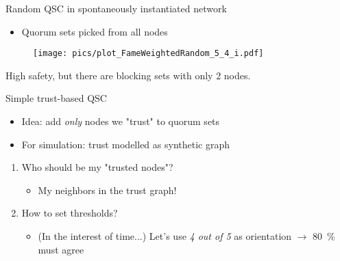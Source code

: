 \documentclass{beamer}
\newcommand{\redalert}[1]{\textcolor{hured}{#1}}
\newcommand{\arrow}[1][]{$\xrightarrow{\text{#1}}$ }
\begin{document}
\begin{frame}{Random QSC in spontaneously instantiated network}
  \begin{itemize}
    \item Quorum sets picked from all nodes
  \end{itemize}
  \begin{figure}[htpb]
    \centering
    \texttt{[image: pics/plot\_FameWeightedRandom\_5\_4\_i.pdf]}
  \end{figure}
  High safety,
  but there are \redalert{blocking sets} with only \redalert{2} nodes.
\end{frame}

\begin{frame}{Simple trust-based QSC}

  \begin{itemize}
    \item Idea: add \emph{only} nodes we "trust" to quorum sets
    \item For simulation: trust modelled as synthetic graph
  \end{itemize}
  \vfill
  \begin{enumerate}
    \item \alert{Who should be my "trusted nodes"?} \begin{itemize}
      \item My neighbors in the trust graph!
    \end{itemize}
    \item \alert{How to set thresholds?} \begin{itemize}
      \item (In the interest of time...) Let's use \emph{4 out of 5} as orientation
        \arrow \SI{80}{\percent} must agree
    \end{itemize}
  \end{enumerate}
\end{frame}
\end{document}
